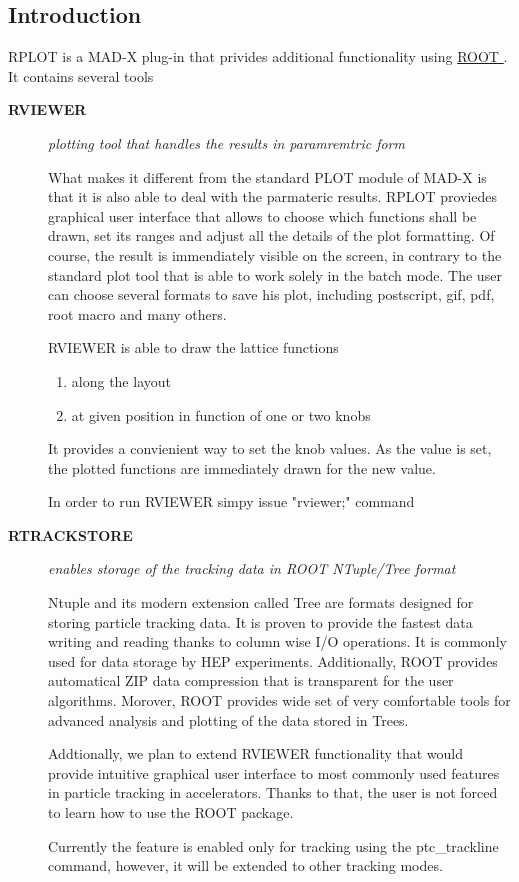 \subsection{ Introduction  }  RPLOT is a MAD-X plug-in that privides additional functionality using  \href{http://root.cern.ch}{ ROOT }.  It contains several tools  
\begin{description}
	\item[\textbf{ RVIEWER }] 

      \textit{ plotting tool that handles the results in paramremtric form }

      What makes it different      from the standard PLOT module of MAD-X is that it is also able to      deal with the parmateric results. RPLOT proviedes graphical user interface      that allows to choose which functions shall be drawn, set its ranges     and adjust all the details of the plot formatting. Of course, the result     is immendiately visible on the screen, in contrary to the standard plot tool     that is able to work solely in the batch mode. The user can choose several      formats to save his plot, including postscript, gif, pdf, root macro and many      others.      

RVIEWER is able to draw the lattice functions     
\begin{enumerate}
	\item  along the layout 
	\item  at given position in function of one or two knobs  
\end{enumerate}     It provides a convienient way to set the knob values. As the value is set,      the plotted functions are immediately drawn for the new value.           

     In order to run RVIEWER simpy issue "rviewer;" command        
	\item[\textbf{ RTRACKSTORE }] \textit{ enables storage of the tracking data in ROOT NTuple/Tree format }

        Ntuple and its modern extension called Tree are formats designed       for storing particle tracking data. It is proven to provide       the fastest data writing and reading thanks to column wise       I/O operations. It is commonly used for data storage by HEP       experiments. Additionally, ROOT provides automatical        ZIP data compression that is transparent for the user algorithms.         Morover, ROOT provides wide set of very comfortable tools       for advanced analysis and plotting of the data stored in Trees.   

          Addtionally, we plan to extend RVIEWER functionality that would provide        intuitive graphical user interface to most commonly used       features in particle tracking in accelerators. Thanks to that,       the user is not forced to learn how to use the ROOT package.   

        Currently the feature is enabled only for tracking using        the ptc\_trackline command, however, it will be extended to       other tracking modes.          
\end{description}

